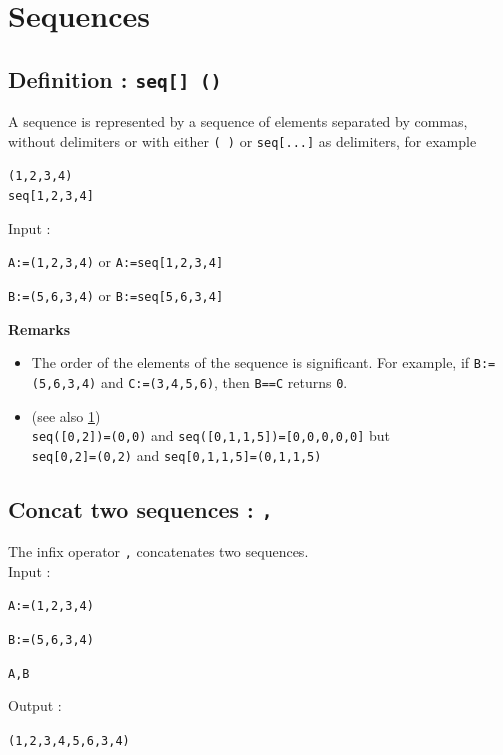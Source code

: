 \documentclass[a4paper,11pt]{book}
\begin{document}
\section{Sequences}
\label{sec:seq}
\subsection{Definition : {\tt seq[]  ()}}\index{()}
A sequence is represented by 
a sequence of elements separated by commas, without
delimiters or with either {\tt ( )} or {\tt seq[...]}
as delimiters, for example
\begin{center}
{\tt (1,2,3,4)}\\
{\tt seq[1,2,3,4]}
\end{center}
Input :
\begin{center}{\tt A:=(1,2,3,4)} or {\tt A:=seq[1,2,3,4]}\end{center}
\begin{center}{\tt B:=(5,6,3,4)} or {\tt B:=seq[5,6,3,4]}\end{center}
{\bf Remarks}
\begin{itemize}
\item The order of the elements of the sequence is significant.
For example, if {\tt B:=(5,6,3,4)} and  {\tt C:=(3,4,5,6)}, then
{\tt B==C} returns {\tt 0}.
\item
(see also \ref{sec:seq})\\
{\tt seq([0,2])=(0,0)} and  {\tt seq([0,1,1,5])=[0,0,0,0,0]} but\\
{\tt seq[0,2]=(0,2)} and  {\tt seq[0,1,1,5]=(0,1,1,5)}
\end{itemize}

\subsection{Concat two sequences : {\tt ,}}\index{,}
The infix operator {\tt ,} concatenates two sequences.\\
Input :
\begin{center}{\tt A:=(1,2,3,4)}\end{center}
\begin{center}{\tt B:=(5,6,3,4)}\end{center}
\begin{center}{\tt A,B}\end{center}
Output :
\begin{center}{\tt (1,2,3,4,5,6,3,4)}\end{center}
\end{document}
